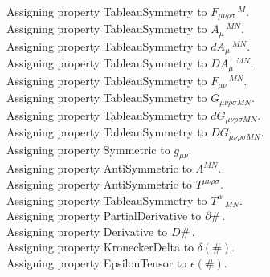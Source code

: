 \documentclass[11pt]{article}
\begin{document}
Assigning property TableauSymmetry to ${F}_{\mu \nu \rho \sigma}\,^{M}$.
\\
Assigning property TableauSymmetry to ${A}_{\mu}\,^{M N}$.
\\
Assigning property TableauSymmetry to ${dA}_{\mu}\,^{M N}$.
\\
Assigning property TableauSymmetry to ${DA}_{\mu}\,^{M N}$.
\\
Assigning property TableauSymmetry to ${F}_{\mu \nu}\,^{M N}$.
\\
Assigning property TableauSymmetry to ${G}_{\mu \nu \rho \sigma M N}$.
\\
Assigning property TableauSymmetry to ${dG}_{\mu \nu \rho \sigma M N}$.
\\
Assigning property TableauSymmetry to ${DG}_{\mu \nu \rho \sigma M N}$.
\\
Assigning property Symmetric to ${g}_{\mu \nu}$.
\\
Assigning property AntiSymmetric to ${\Lambda}^{M N}$.
\\
Assigning property AntiSymmetric to ${T}^{\mu \nu \rho \sigma}$.
\\
Assigning property TableauSymmetry to ${T}^{\alpha}\,_{M N}$.
\\
Assigning property PartialDerivative to $\partial{\#}\, $.
\\
Assigning property Derivative to $D{\#}\, $.
\\
Assigning property KroneckerDelta to $\delta(\#)$.
\\
Assigning property EpsilonTensor to $\epsilon(\#)$.
\\
\end{document}
